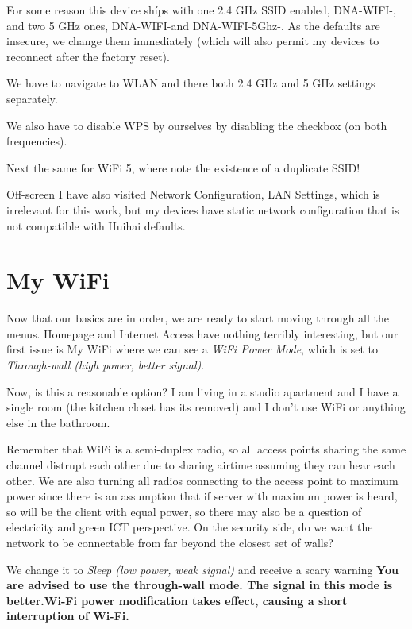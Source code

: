 \documentclass[../wifi-security.tex]{subfiles}
\begin{document}
For some reason this device shíps with one 2.4 GHz SSID enabled, DNA-WIFI-\Name, and two 5 GHz ones, DNA-WIFI-\Name and DNA-WIFI-5Ghz-\Name. As the defaults are insecure, we change them immediately (which will also permit my devices to reconnect after the factory reset).

We have to navigate to WLAN and there both 2.4 GHz and 5 GHz settings separately.

We also have to disable WPS by ourselves by disabling the checkbox (on both frequencies).


Next the same for WiFi 5, where note the existence of a duplicate SSID!

Off-screen I have also visited Network Configuration, LAN Settings, which is irrelevant for this work, but my devices have static network configuration that is not compatible with Huihai defaults.

\section{My WiFi}

Now that our basics are in order, we are ready to start moving through all the menus. Homepage and Internet Access have nothing terribly interesting, but our first issue is My WiFi where we can see a \textit{WiFi Power Mode}, which is set to \textit{Through-wall (high power, better signal)}.

Now, is this a reasonable option? I am living in a studio apartment and I have a single room (the kitchen closet has its removed) and I don't use WiFi or anything else in the bathroom.

Remember that WiFi is a semi-duplex radio, so all access points sharing the same channel distrupt each other due to sharing airtime assuming they can hear each other. We are also turning all radios connecting to the access point to maximum power since there is an assumption that if server with maximum power is heard, so will be the client with equal power, so there may also be a question of electricity and green ICT perspective. On the security side, do we want the network to be connectable from far beyond the closest set of walls? \autocite{metistxpower}

We change it to \textit{Sleep (low power, weak signal)} and receive a scary warning \textbf{You are advised to use the through-wall mode. The signal in this mode is better.Wi-Fi power modification takes effect, causing a short interruption of Wi-Fi.}
\end{document}
